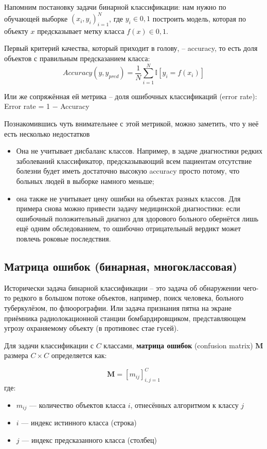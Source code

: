 Напомним постановку задачи бинарной классификации: нам нужно по обучающей выборке
${(x_i,y_i)}_{i=1}^N$, где $y_i \in {0,1}$ построить модель, которая по объекту $x$ предсказывает метку класса
$f(x) \in {0,1}$.

Первый критерий качества, который приходит в голову, -- accuracy, то есть доля объектов с правильным предсказанием
класса:
\[ Accuracy(y,y_{pred}) = \frac{1}{N} \sum_{i=1}^N \mathbb{I} [y_i = f(x_i)] \]

Или же сопряжённая ей метрика -- доля ошибочных классификаций (error rate): Error rate = 1 − Accuracy

Познакомившись чуть внимательнее с этой метрикой, можно заметить, что у неё есть несколько недостатков

\begin{itemize}
    \item Она не учитывает дисбаланс классов.
    Например, в задаче диагностики редких заболеваний классификатор, предсказывающий всем пациентам отсутствие
    болезни будет иметь достаточно высокую accuracy просто потому, что больных людей в выборке намного меньше;
    \item она также не учитывает цену ошибки на объектах разных классов.
    Для примера снова можно привести задачу медицинской диагностики: если ошибочный положительный диагноз для
    здорового больного обернётся лишь ещё одним обследованием, то ошибочно отрицательный вердикт может повлечь
    роковые последствия.
\end{itemize}

\subsection{Матрица ошибок (бинарная, многоклассовая)}

Исторически задача бинарной классификации -- это задача об обнаружении чего-то редкого в большом потоке объектов,
например, поиск человека, больного туберкулёзом, по флюорографии.
Или задача признания пятна на экране приёмника радиолокационной станции бомбардировщиком, представляющем угрозу
охраняемому объекту (в противовес стае гусей).

Для задачи классификации с $C$ классами, \textbf{матрица ошибок} (confusion matrix) $\mathbf{M}$ размера $C \times C$
определяется как:

\[ \mathbf{M} = [m_{ij}]_{i,j=1}^{C} \]
где:
\begin{itemize}
    \item $m_{ij}$ --- количество объектов класса $i$, отнесённых алгоритмом к классу $j$
    \item $i$ --- индекс истинного класса (строка)
    \item $j$ --- индекс предсказанного класса (столбец)
\end{itemize}

